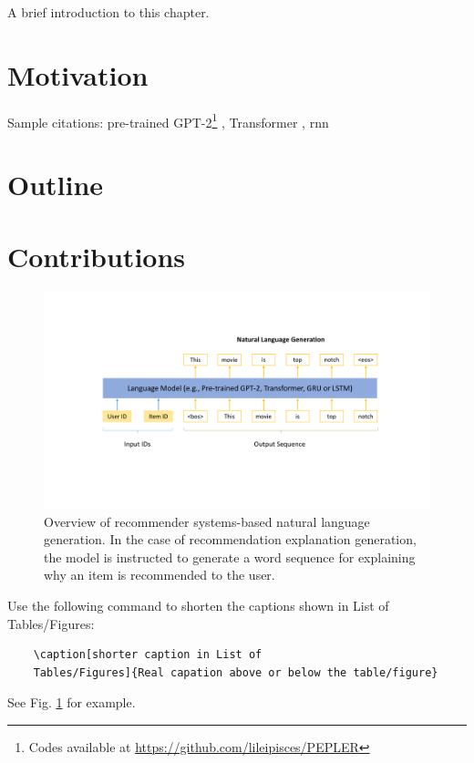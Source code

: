 A brief introduction to this chapter.

\section{Motivation}

Sample citations: pre-trained GPT-2\footnote{Codes available at \url{https://github.com/lileipisces/PEPLER}} \cite{22-PEPLER}, Transformer \cite{ACL21-PETER}, \gls*{rnn} \cite{CIKM20-NETE}

\section{Outline}

\section{Contributions}

\begin{figure}
	\centering
	\includegraphics[scale=0.5]{fig/ch1/NLG4RS.pdf}
	\caption[Overview of recommender systems-based natural language generation.]{Overview of recommender systems-based natural language generation. In the case of recommendation explanation generation, the model is instructed to generate a word sequence for explaining why an item is recommended to the user.}
	\label{fig1:model}
\end{figure}

Use the following command to shorten the captions shown in List of Tables/Figures:
\begin{verbatim}
	\caption[shorter caption in List of
	Tables/Figures]{Real capation above or below the table/figure}
\end{verbatim}
See Fig. \ref{fig1:model} for example.

